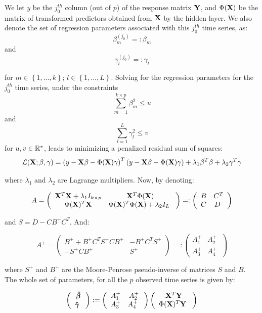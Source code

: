 \medskip

We let $y$ be the $j_0^{th}$ column (out of $p$) of the response matrix ${\bf Y}$, and $\Phi({\bf X})$ be the matrix of transformed predictors obtained from ${\bf X}$ by the hidden layer. We also denote the set of regression parameters associated with this $j_0^{th}$ time series, as:
$$
\beta_m^{(j_0)} =: \beta_m
$$
and
$$
\gamma_l^{(j_0)} =: \gamma_l
$$

for $m \in \left\lbrace 1, \ldots, k \right\rbrace$; $l \in \left\lbrace 1, \ldots,  L\right\rbrace$. Solving for the regression parameters for the $j_0^{th}$ time series, under the constraints
$$
\sum_{m=1}^{k\times p} \beta_m^2 \leq u
$$
and
$$
\sum_{l=1}^L \gamma_l^2 \leq v
$$
for $u, v \in \mathbb{R}^*$, leads to minimizing a penalized residual sum of squares:
$$
\mathcal{L}({\bf X}; \beta, \gamma) = \left(y - {\bf X}\beta -
\Phi({\bf X})\gamma\right)^T\left(y - {\bf X}\beta - \Phi({\bf X})\gamma\right) + \lambda_1
\beta^T \beta + \lambda_2 \gamma^T\gamma
$$

\medskip

where $\lambda_1$ and $\lambda_2$ are Lagrange multipliers. Now, by denoting:

$$ A = \left( {\begin{array}{cc} {\bf X}^T{\bf X} + \lambda_1 I_{k\times p} &  {\bf X}^T\Phi({\bf X})\\
\Phi({\bf X})^T{\bf X} & \Phi({\bf X})^T\Phi({\bf X}) + \lambda_2 I_{L} \      \end{array} } \right) =:
\left( {\begin{array}{cc} B &  C^T\\ C & D \      \end{array} } \right) $$

and $S = D - CB^+C^T$. And:

$$
A^+ = \left( {\begin{array}{cc} B^+ + B^+ C^T
S^+ CB^+  &  -B^+ C^T S^+\\ -S^+CB^+ & S^+ \      \end{array} } \right) =:
\left( {\begin{array}{cc} A_1^+  &  A_2^+\\ A_3^+ & A_4^+ \      \end{array} }
\right)
$$


where $S^+$ and $B^+$ are the Moore-Penrose pseudo-inverse of matrices $S$ and
$B$. The whole set of parameters, for all the $p$ observed time series is given by:

$$
\left( {\begin{array}{c} \bm{\hat{\beta}} \\       \bm{\hat{\gamma}} \      \end{array}
} \right) := \left( {\begin{array}{cc} A_1^+  &  A_2^+\\ A_3^+ & A_4^+ \      \end{array}
} \right)\left( {\begin{array}{c} {\bf X}^T{\bf Y} \\       \Phi({\bf X})^T{\bf Y} \      \end{array} }
\right)
$$


